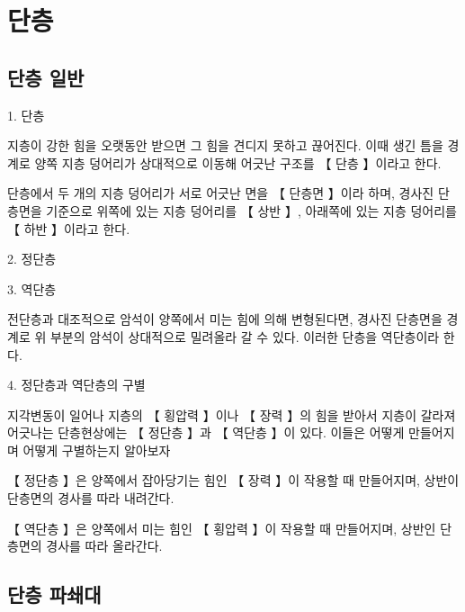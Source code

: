\documentclass[12pt, a4paper, oneside]{book}
\begin{document}
	\newpage
	\chapter{단층}





	\newpage  \null
	\section{단층 일반}



1. 		단층


지층이 강한 힘을 오랫동안 받으면 그 힘을 견디지 못하고 끊어진다. 이때 생긴 틈을 경계로 양쪽 지층 덩어리가 상대적으로 이동해 어긋난 구조를 【 단층 】이라고 한다.


단층에서 두 개의 지층 덩어리가 서로 어긋난 면을 【 단층면 】이라 하며, 경사진 단층면을 기준으로 위쪽에 있는 지층 덩어리를 【 상반 】, 아래쪽에 있는 지층 덩어리를 【 하반 】이라고 한다.



2. 		정단층





3. 		역단층


전단층과 대조적으로 암석이 양쪽에서 미는 힘에 의해 변형된다면, 경사진 단층면을 경계로 위 부분의 암석이 상대적으로 밀려올라 갈 수 있다. 이러한 단층을 역단층이라 한다.




4. 		정단층과 역단층의 구별

지각변동이 일어나 지층의 【 횡압력 】이나 【 장력 】의 힘을 받아서 지층이 갈라져 어긋나는 단층현상에는 【 정단층 】과 【 역단층 】이 있다. 이들은 어떻게 만들어지며 어떻게 구별하는지 알아보자

【 정단층 】은 양쪽에서 잡아당기는 힘인 【 장력 】이 작용할 때 만들어지며, 상반이 단층면의 경사를 따라 내려간다. 

【 역단층 】은 양쪽에서 미는 힘인 【 횡압력 】이 작용할 때 만들어지며, 상반인 단층면의 경사를 따라 올라간다.






	\newpage  \null
	\section{단층 파쇄대}
\end{document}
